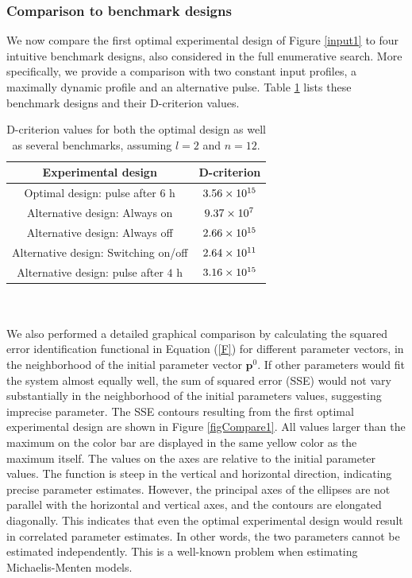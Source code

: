 \subsubsection{Comparison to benchmark designs}
We now compare the first optimal experimental design of Figure \ref{input1} to four intuitive benchmark designs, also considered in the full enumerative search. More specifically, we provide a comparison with two constant input profiles, a maximally dynamic profile and an alternative pulse. Table \ref{table1} lists these benchmark designs and their D-criterion values.
\begin{table}
	\centering
	\begin{tabular}{|c|c|}
		\hline 
		Experimental design & D-criterion \\ 
		\hline 
		Optimal design: pulse after $6 \text{ h}$& $3.56\times 10^{15}$  \\ 
		
		Alternative design: Always on & $9.37\times 10^{7}$ \\ 
		
		Alternative design: Always off & $2.66\times 10^{15}$ \\ 
		
		Alternative design: Switching on/off & $2.64\times 10^{11}$ \\ 
		
		Alternative design: pulse after $4 \text{ h}$ & 
		$3.16\times 10^{15}$ \\ 
		\hline
	\end{tabular} 
	\caption{D-criterion values for both the optimal design as well as several benchmarks, assuming $l=2$ and $n=12$.} 
	\label{table1}
\end{table}
\\
\\
We also performed a detailed graphical comparison by calculating the squared error identification functional in Equation (\ref{F}) for different parameter vectors, in the neighborhood of the initial parameter vector $\mathbf{p}^0$. If other parameters would fit the system almost equally well, the sum of squared error (SSE) would not vary substantially in the neighborhood of the initial parameters values, suggesting imprecise parameter. The SSE contours resulting from the first optimal experimental design are shown in Figure \ref{figCompare1}. All values larger than the maximum on the color bar are displayed in the same yellow color as the maximum itself. The values on the axes are relative to the initial parameter values. The function is steep in the vertical and horizontal direction, indicating precise parameter estimates. However, the principal axes of the ellipses are not parallel with the horizontal and vertical axes, and the contours are elongated diagonally. This indicates that even the optimal experimental design would result in correlated parameter estimates. In other words, the two parameters cannot be estimated independently. This is a well-known problem when estimating Michaelis-Menten models.
